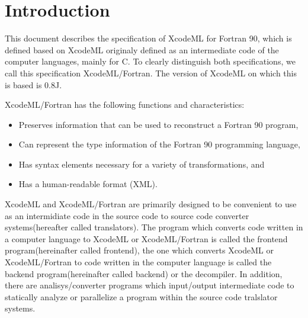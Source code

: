 \section{Introduction}


This document describes the specification of XcodeML for Fortran 90, which is defined based on XcodeML originaly defined as an intermediate code of the computer languages, mainly for C. To clearly distinguish both specifications, we call this specification XcodeML/Fortran. The version of XcodeML on which this is based is 0.8J.


XcodeML/Fortran has the following functions and characteristics:

\begin{itemize}
\item Preserves information that can be used to reconstruct a Fortran 90 program,
\item Can represent the type information of the Fortran 90 programming language,
\item Has syntax elements necessary for a variety of transformations, and
\item Has a human-readable format (XML).
\end{itemize}

XcodeML and XcodeML/Fortran are primarily designed to be convenient to use as an intermidiate code in the source code to source code converter systems(hereafter called translators). The program which converts code written in a computer language to XcodeML or XcodeML/Fortran is called the frontend program(hereinafter called frontend), the one which converts XcodeML or XcodeML/Fortran to code written in the computer language is called the backend program(hereinafter called backend) or the decompiler. In addition, there are analisys/converter programs which input/output intermediate code to statically analyze or parallelize a program within the source code tralslator systems.
